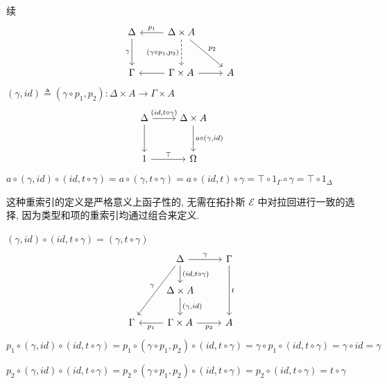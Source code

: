 \documentclass[aspectratio=169,xcolor=dvipsnames]{beamer}
\newcommand\calE{\mathcal{E}}
\begin{document}
\begin{frame}{续}
\[
  \begin{tikzcd}[row sep=large]
  \Delta \arrow[d,"\gamma"'] & \Delta\times A \arrow[l,"p_1"'] \arrow[d,dashed,"{(\gamma\circ p_1,p_2)}"'] \arrow[dr,"p_2"] & \\
  \Gamma & \Gamma\times A \arrow[l] \arrow[r] & A
  \end{tikzcd}
\]
$(\gamma,id) \triangleq (\gamma\circ p_1,p_2) : \Delta\times A \to\Gamma\times A$
\[
\begin{tikzcd}[row sep=large]
  \Delta \arrow[d] \arrow[r,"{(id,t\circ\gamma)}"] & \Delta\times A \arrow[d,"{a\circ(\gamma,id)}"]\\
  1 \arrow[r,"\top"] & \Omega
\end{tikzcd}
\]
$a\circ(\gamma,id)\circ(id,t\circ\gamma)=a\circ(\gamma,t\circ\gamma)=a\circ(id,t)\circ\gamma=\top\circ1_{\Gamma}\circ\gamma=\top\circ1_{\Delta}$

这种重索引的定义是严格意义上函子性的, 无需在拓扑斯 $\calE$ 中对拉回进行一致的选择, 因为类型和项的重索引均通过组合来定义.
\end{frame}

\begin{frame}[fragile]{$(\gamma,id)\circ(id,t\circ\gamma)=(\gamma,t\circ\gamma)$}
  \[
  \begin{tikzcd}
    & \Delta \arrow[d,"{(id,t\circ\gamma)}"] \arrow[ddl,"\gamma"'] \arrow[r,"\gamma"] & \Gamma \arrow[dd,"t"] \\
    & \Delta\times A \arrow[d,"{(\gamma,id)}"] & \\
    \Gamma & \Gamma\times A \arrow[l,"{p_1}"] \arrow[r,"{p_2}"'] & A
  \end{tikzcd}
  \]
  $p_1\circ(\gamma,id)\circ(id,t\circ\gamma)=p_1\circ(\gamma\circ p_1,p_2)\circ(id,t\circ\gamma)=\gamma\circ p_1 \circ (id,t\circ\gamma)=\gamma\circ id=\gamma$

  $p_2\circ(\gamma,id)\circ(id,t\circ\gamma)=p_2\circ(\gamma\circ p_1,p_2)\circ(id,t\circ\gamma)=p_2\circ(id,t\circ\gamma)=t\circ\gamma$
\end{frame}
\end{document}
